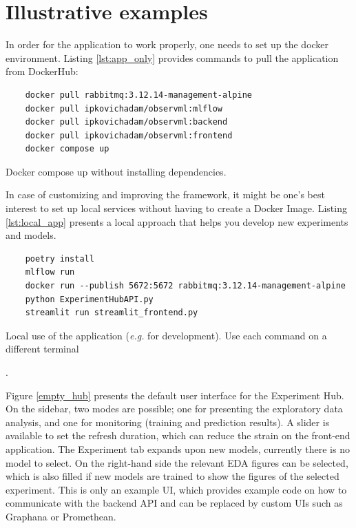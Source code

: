 \documentclass[preprint,12pt, a4paper]{elsarticle}
\begin{document}
  \clearpage
\section{Illustrative examples}

In order for the application to work properly, one needs to set up the docker environment. Listing \ref{lst:app_only} provides commands to pull the application from DockerHub:

\begin{listing}[h!]
\begin{verbatim}
    docker pull rabbitmq:3.12.14-management-alpine 
    docker pull ipkovichadam/observml:mlflow
    docker pull ipkovichadam/observml:backend
    docker pull ipkovichadam/observml:frontend
    docker compose up
    \end{verbatim}
\caption{Docker compose up without installing dependencies.}
\label{lst:app_only}
\end{listing}

In case of customizing and improving the framework, it might be one's best interest to set up local services without having to create a Docker Image. Listing \ref{lst:local_app} presents a local approach that helps you develop new experiments and models. 

\begin{listing}[h!]
\begin{verbatim}
    poetry install
    mlflow run
    docker run --publish 5672:5672 rabbitmq:3.12.14-management-alpine
    python ExperimentHubAPI.py
    streamlit run streamlit_frontend.py
\end{verbatim}
\caption{Local use of the application (\textit{e.g.} for development). Use each command on a different terminal}
\label{lst:local_app}.
\end{listing}



Figure \ref{empty_hub} presents the default user interface for the Experiment Hub. On the sidebar, two modes are possible; one for presenting the exploratory data analysis, and one for monitoring (training and prediction results). A slider is available to set the refresh duration, which can reduce the strain on the front-end application. The Experiment tab expands upon new models, currently there is no model to select. On the right-hand side the relevant EDA figures can be selected, which is also filled if new models are trained to show the figures of the selected experiment. This is only an example UI, which provides example code on how to communicate with the backend API and can be replaced by custom UIs such as Graphana or Promethean.
\end{document}
